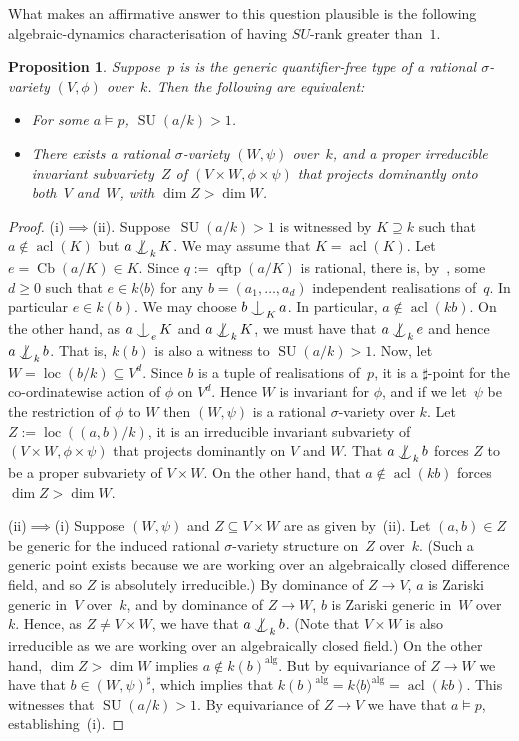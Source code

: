 \documentclass[\DocOpts]{amsart}
\newtheorem{proposition}[theorem]{Proposition}
\theoremstyle{definition}
\def\cb{\operatorname{Cb}}
\def\qftp{\operatorname{qftp}}
\def\acl{\operatorname{acl}}
\def\alg{{\operatorname{alg}}}
\def\loc{\operatorname{loc}}
\def\su{\operatorname{SU}}
\newcommand{\<}{\langle}
\renewcommand{\>}{\rangle}
\def\Ind#1#2{#1\setbox0=\hbox{\(#1x\)}\kern\wd0\hbox to 
0pt{\hss\(#1\mid\)\hss}\lower.9\ht0\hbox to 
0pt{\hss\(#1\smile\)\hss}\kern\wd0}
\def\ind{\mathop{\mathpalette\Ind{}}}
\def\notind#1#2{#1\setbox0=\hbox{\(#1x\)}\kern\wd0\hbox to 
0pt{\mathchardef\nn=12854\hss\(#1\nn\)\kern1.4\wd0\hss}\hbox to 
0pt{\hss\(#1\mid\)\hss}\lower.9\ht0 \hbox to 
0pt{\hss\(#1\smile\)\hss}\kern\wd0}
\def\nind{\mathop{\mathpalette\notind{}}}
\begin{document}
What makes an affirmative answer to this question plausible is the following algebraic-dynamics characterisation of having $SU$-rank greater than~$1$.

\begin{proposition}
\label{prop:nonmin-geo}
Suppose~\(p\) is is the generic quantifier-free type of a rational $\sigma$-variety $(V,\phi)$ over~$k$.
Then the following are equivalent:
\begin{itemize}
\item[(i)]
For some $a\models p$, \(\su(a/k)>1\).
\item[(ii)]
There exists a rational $\sigma$-variety $(W,\psi)$ over~$k$, and a proper irreducible invariant subvariety~$Z$ of $(V\times W,\phi\times\psi)$ that projects dominantly onto both~$V$ and~$W$, with $\dim Z>\dim W$.
\end{itemize}
\end{proposition}

\begin{proof}
(i)$\implies$(ii).
Suppose~$\su(a/k)>1$ is witnessed by $K\supseteq k$ such that $a\notin\acl(K)$ but $a\nind_kK$.
We may assume that $K=\acl(K)$.
Let $e=\cb(a/K)\in K$.
Since $q:=\qftp(a/K)$ is rational, there is, by~\cite[Lemma~2.5(c)]{qfint}, 
some $d\geq 0$  such that $e\in k\langle b\rangle$ for any $b=(a_1,\dots,a_d)$ 
independent realisations of~$q$.
In particular $e\in k(b)$.
We may choose $b\ind_Ka$.
In particular, $a\notin\acl(kb)$.
On the other hand, as $a\ind_{e}K$ and $a\nind_kK$, we must have that 
$a\nind_ke$ and hence $a\nind_kb$.
That is, $k(b)$ is also a witness to $\su(a/k)>1$.
Now, let $W=\loc(b/k)\subseteq V^d$.
Since $b$ is a tuple of realisations of~$p$, it is a $\sharp$-point for the 
co-ordinatewise action of $\phi$ on $V^d$.
Hence $W$ is invariant for $\phi$, and if we let~$\psi$ be the restriction of $\phi$ to $W$ then $(W,\psi)$ is a rational $\sigma$-variety over $k$.
Let $Z:=\loc((a,b)/k)$, it is an irreducible invariant subvariety of $(V\times W,\phi\times\psi)$ that projects dominantly on $V$ and $W$.
That $a\nind_kb$ forces $Z$ to be a proper subvariety of $V\times W$.
On the other hand, that $a\notin\acl(kb)$ forces 
\(\dim{}Z>\dim{}W\).


(ii)$\implies$(i)
Suppose $(W,\psi)$ and $Z\subseteq V\times W$ are as given by~(ii).
Let $(a,b)\in Z$ be generic for the induced rational $\sigma$-variety structure on~$Z$ over~$k$.
(Such a generic point exists because we are working over an algebraically closed difference field, and so $Z$ is absolutely irreducible.)
By dominance of $Z\to V$, $a$ is Zariski generic in~$V$ over~$k$, and by dominance of $Z\to W$, $b$ is Zariski generic in~$W$ over~$k$.
Hence, as $Z\neq V\times W$, we have that $a\nind_kb$.
(Note that $V\times W$ is also irreducible as we are working over an algebraically 
closed field.)
On the other hand, $\dim Z>\dim W$ implies $a\notin{k(b)}^{\alg}$.
But by equivariance of $Z\to W$ we have that $b\in{(W,\psi)}^\sharp$, which 
implies that \({k(b)}^{\alg}={k\langle{}b\rangle}^{\alg}=\acl(kb)\).
This witnesses that $\su(a/k)>1$.
By equivariance of $Z\to V$ we have that $a\models p$, establishing~(i).
\end{proof}
\end{document}
